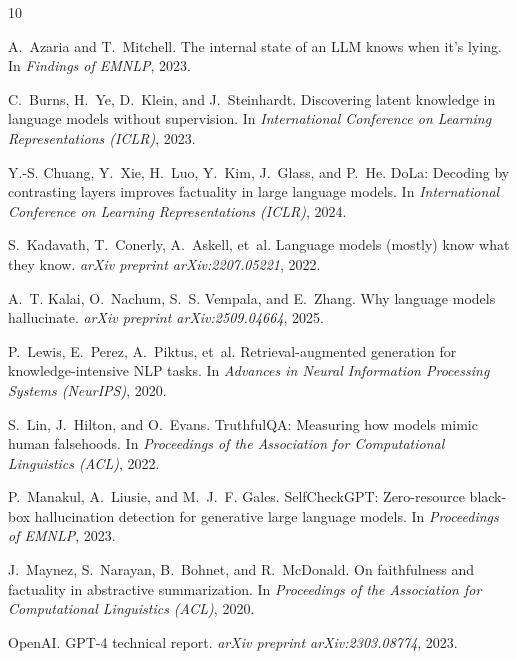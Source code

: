 \documentclass[11pt]{article}
\begin{document}

\begin{thebibliography}{10}

A.~Azaria and T.~Mitchell.
\newblock The internal state of an LLM knows when it's lying.
\newblock In \emph{Findings of EMNLP}, 2023.

C.~Burns, H.~Ye, D.~Klein, and J.~Steinhardt.
\newblock Discovering latent knowledge in language models without supervision.
\newblock In \emph{International Conference on Learning Representations (ICLR)}, 2023.

Y.-S. Chuang, Y.~Xie, H.~Luo, Y.~Kim, J.~Glass, and P.~He.
\newblock DoLa: Decoding by contrasting layers improves factuality in large language models.
\newblock In \emph{International Conference on Learning Representations (ICLR)}, 2024.

S.~Kadavath, T.~Conerly, A.~Askell, et~al.
\newblock Language models (mostly) know what they know.
\newblock \emph{arXiv preprint arXiv:2207.05221}, 2022.

A.~T. Kalai, O.~Nachum, S.~S. Vempala, and E.~Zhang.
\newblock Why language models hallucinate.
\newblock \emph{arXiv preprint arXiv:2509.04664}, 2025.

P.~Lewis, E.~Perez, A.~Piktus, et~al.
\newblock Retrieval-augmented generation for knowledge-intensive NLP tasks.
\newblock In \emph{Advances in Neural Information Processing Systems (NeurIPS)}, 2020.

S.~Lin, J.~Hilton, and O.~Evans.
\newblock TruthfulQA: Measuring how models mimic human falsehoods.
\newblock In \emph{Proceedings of the Association for Computational Linguistics (ACL)}, 2022.

P.~Manakul, A.~Liusie, and M.~J.~F. Gales.
\newblock SelfCheckGPT: Zero-resource black-box hallucination detection for generative large language models.
\newblock In \emph{Proceedings of EMNLP}, 2023.

J.~Maynez, S.~Narayan, B.~Bohnet, and R.~McDonald.
\newblock On faithfulness and factuality in abstractive summarization.
\newblock In \emph{Proceedings of the Association for Computational Linguistics (ACL)}, 2020.

OpenAI.
\newblock GPT-4 technical report.
\newblock \emph{arXiv preprint arXiv:2303.08774}, 2023.

\end{thebibliography}
\end{document}
